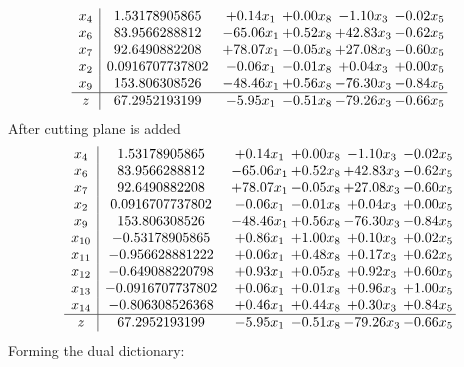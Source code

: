 \documentclass[8pt]{article}
\begin{document}
\[\begin{array}{c| c c@{\hskip 2pt} c@{\hskip 2pt} c@{\hskip 2pt} c@{\hskip 2pt} }
 x_{4}   &  1.53178905865 & +  0.14 x_{1} & +  0.00 x_{8} & -1.10 x_{3} & -0.02 x_{5}\\
 x_{6}   &  83.9566288812 & -65.06 x_{1} & +  0.52 x_{8} & + 42.83 x_{3} & -0.62 x_{5}\\
 x_{7}   &  92.6490882208 & + 78.07 x_{1} & -0.05 x_{8} & + 27.08 x_{3} & -0.60 x_{5}\\
 x_{2}   &  0.0916707737802 & -0.06 x_{1} & -0.01 x_{8} & +  0.04 x_{3} & +  0.00 x_{5}\\
 x_{9}   &  153.806308526 & -48.46 x_{1} & +  0.56 x_{8} & -76.30 x_{3} & -0.84 x_{5}\\
\hline
z    &  67.2952193199 & -5.95 x_{1} & -0.51 x_{8} & -79.26 x_{3} & -0.66 x_{5}\\
\end{array}\]
 After cutting plane is added 
\[\begin{array}{c| c c@{\hskip 2pt} c@{\hskip 2pt} c@{\hskip 2pt} c@{\hskip 2pt} }
 x_{4}   &  1.53178905865 & +  0.14 x_{1} & +  0.00 x_{8} & -1.10 x_{3} & -0.02 x_{5}\\
 x_{6}   &  83.9566288812 & -65.06 x_{1} & +  0.52 x_{8} & + 42.83 x_{3} & -0.62 x_{5}\\
 x_{7}   &  92.6490882208 & + 78.07 x_{1} & -0.05 x_{8} & + 27.08 x_{3} & -0.60 x_{5}\\
 x_{2}   &  0.0916707737802 & -0.06 x_{1} & -0.01 x_{8} & +  0.04 x_{3} & +  0.00 x_{5}\\
 x_{9}   &  153.806308526 & -48.46 x_{1} & +  0.56 x_{8} & -76.30 x_{3} & -0.84 x_{5}\\
 x_{10}   &  -0.53178905865 & +  0.86 x_{1} & +  1.00 x_{8} & +  0.10 x_{3} & +  0.02 x_{5}\\
 x_{11}   &  -0.956628881222 & +  0.06 x_{1} & +  0.48 x_{8} & +  0.17 x_{3} & +  0.62 x_{5}\\
 x_{12}   &  -0.649088220798 & +  0.93 x_{1} & +  0.05 x_{8} & +  0.92 x_{3} & +  0.60 x_{5}\\
 x_{13}   &  -0.0916707737802 & +  0.06 x_{1} & +  0.01 x_{8} & +  0.96 x_{3} & +  1.00 x_{5}\\
 x_{14}   &  -0.806308526368 & +  0.46 x_{1} & +  0.44 x_{8} & +  0.30 x_{3} & +  0.84 x_{5}\\
\hline
z    &  67.2952193199 & -5.95 x_{1} & -0.51 x_{8} & -79.26 x_{3} & -0.66 x_{5}\\
\end{array}\]
Forming the dual dictionary:
\end{document}
